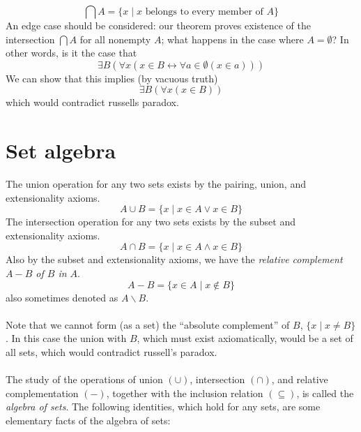 \documentclass{report}
\begin{document}
\begin{equation*}
\bigcap A=\{x\mid x\text{ belongs to every member of $A$}\}
\end{equation*}
An edge case should be considered: our theorem proves existence of the intersection $\bigcap A$ for all nonempty $A$; what happens in the case where $A=\emptyset$? In other words,
is it the case that
\begin{equation*}
\exists B(\forall x(x\in B\leftrightarrow \forall a\in\emptyset(x\in a)))
\end{equation*}
We can show that this implies (by vacuous truth)
\begin{equation*}
\exists B(\forall x(x\in B))
\end{equation*}
which would contradict russells paradox. 
\newpage

\section{Set algebra}
The union operation for any two sets exists by the pairing, union, and extensionality axioms.
\begin{equation*}
A\cup B=\{x\mid x\in A\lor x\in B\}
\end{equation*}
The intersection operation for any two sets exists by the subset and extensionality axioms.
\begin{equation*}
A\cap B=\{x\mid x\in A\land x\in B\}
\end{equation*}
Also by the subset and extensionality axioms, we have the \textit{relative complement $A-B$ of $B$ in $A$}.
\begin{equation*}
A-B=\{x\in A\mid x\notin B\}
\end{equation*}
also sometimes denoted as $A\backslash B$.\\
\vspace{1mm}\\
Note that we cannot form (as a set) the ``absolute complement'' of $B$, $\{x\mid x\neq B\}$. In this case the union with $B$, which must exist axiomatically, would be a set of all sets, which 
would contradict russell's paradox.\\
\vspace{1mm}\\
The study of the operations of union $(\cup)$, intersection $(\cap)$, and relative complementation $(-)$, together with the inclusion relation $(\subseteq)$, is called the \textit{algebra of sets}.
The following identities, which hold for any sets, are some elementary facts of the algebra of sets:\\
\end{document}
